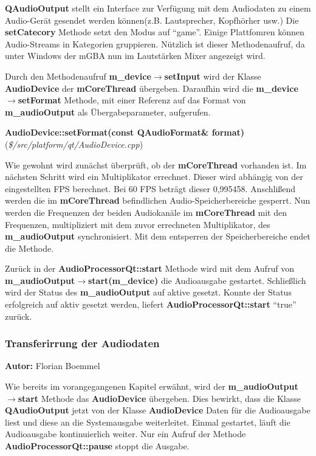 \documentclass[11pt,a4paper]{scrartcl}
\newcommand{\AutorFlorian} {
    \vspace{-4mm}
    \large \textbf{Autor:} Florian Boemmel \normalsize
    \vspace{2mm}
}
\newcommand{\paratitlecode}[2] {
    \vspace{5mm}
    \large \textbf{#1} \normalsize(\textit{\${#2}})
    \vspace{2mm}\newline
}
\begin{document}
\textbf{QAudioOutput} stellt ein Interface zur Verf\"ugung mit dem Audiodaten zu einem Audio-Ger\"at
gesendet werden k\"onnen(z.B. Lautsprecher, Kopfh\"orher usw.) Die \textbf{setCatecory} Methode setzt den Modus auf \enquote{game}. Einige Plattfomren k\"onnen Audio-Streams in Kategorien gruppieren.
N\"utzlich ist dieser Methodenaufruf, da unter Windows der mGBA nun im Lautst\"arken Mixer angezeigt wird.

Durch den Methodenaufruf \textbf{m\_device$\rightarrow$setInput} wird der Klasse \textbf{AudioDevice} der \textbf{mCoreThread} \"ubergeben. Daraufhin wird die \textbf{m\_device$\rightarrow$setFormat} Methode, mit einer Referenz auf
das Format von \textbf{m\_audioOutput} als \"Ubergabeparameter, aufgerufen.

\newpage
\paratitlecode{AudioDevice::setFormat(const QAudioFormat\& format)}{/src/platform/qt/AudioDevice.cpp} 
Wie gewohnt wird zun\"achst \"uberpr\"uft, ob der \textbf{mCoreThread} vorhanden ist. Im n\"achsten Schritt wird ein Multiplikator errechnet. Dieser wird abh\"angig von der eingestellten FPS berechnet. Bei 60 FPS betr\"agt dieser
0,995458. Anschli{\ss}end werden die im \textbf{mCoreThread} befindlichen Audio-Speicherbereiche gesperrt. Nun werden die Frequenzen der beiden Audiokan\"ale im \textbf{mCoreThread} mit den Frequenzen, multipliziert mit dem zuvor errechneten
Multiplikator, des \textbf{m\_audioOutput} synchronisiert. Mit dem entsperren der Speicherbereiche endet die Methode.

Zur\"uck in der \textbf{AudioProcessorQt::start} Methode wird mit dem Aufruf von \textbf{m\_audioOutput$\rightarrow$start(m\_device)} die Audioausgabe gestartet. Schlie{\ss}lich wird der Status des \textbf{m\_audioOutput} auf aktive gesetzt.
Konnte der Status erfolgreich auf aktiv gesetzt werden, liefert \textbf{AudioProcessorQt::start} \enquote{true} zur\"uck.
 
\subsubsection{Transferirrung der Audiodaten}
\AutorFlorian

Wie bereits im vorangegangenen Kapitel erw\"ahnt, wird der \textbf{m\_audioOutput$\rightarrow$start} Methode das \textbf{AudioDevice} \"ubergeben. Dies bewirkt, dass die Klasse \textbf{QAudioOutput} jetzt von der Klasse \textbf{AudioDevice} 
Daten f\"ur die Audioausgabe liest und diese an die Systemausgabe weiterleitet. Einmal gestartet, l\"auft die Audioausgabe kontinuierlich weiter. Nur ein Aufruf der Methode \textbf{AudioProcessorQt::pause} stoppt die Ausgabe.
\end{document}
